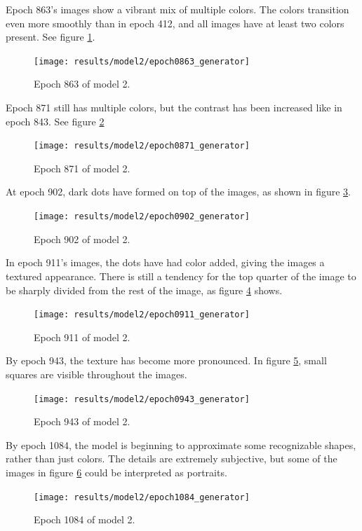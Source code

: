 \documentclass[11pt,letterpaper]{article}
\begin{document}
				Epoch 863's images show a vibrant mix of multiple colors.
				The colors transition even more smoothly than in epoch 412, and all images have at least two colors present.
				See figure \ref{fig:cgvg:epoch0863generator}.
				\begin{figure}
					\centering
					\texttt{[image: results/model2/epoch0863\_generator]}
					\caption{Epoch 863 of model 2.}
					\label{fig:cgvg:epoch0863generator}
				\end{figure}

				Epoch 871 still has multiple colors, but the contrast has been increased like in epoch 843.
				See figure \ref{fig:cgvg:epoch0871generator}
				\begin{figure}
					\centering
					\texttt{[image: results/model2/epoch0871\_generator]}
					\caption{Epoch 871 of model 2.}
					\label{fig:cgvg:epoch0871generator}
				\end{figure}

				At epoch 902, dark dots have formed on top of the images, as shown in figure \ref{fig:cgvg:epoch0902generator}.
				\begin{figure}
					\centering
					\texttt{[image: results/model2/epoch0902\_generator]}
					\caption{Epoch 902 of model 2.}
					\label{fig:cgvg:epoch0902generator}
				\end{figure}

				In epoch 911's images, the dots have had color added, giving the images a textured appearance.
				There is still a tendency for the top quarter of the image to be sharply divided from the rest of the image, as figure \ref{fig:cgvg:epoch0911generator} shows.
				\begin{figure}
					\centering
					\texttt{[image: results/model2/epoch0911\_generator]}
					\caption{Epoch 911 of model 2.}
					\label{fig:cgvg:epoch0911generator}
				\end{figure}

				By epoch 943, the texture has become more pronounced.
				In figure \ref{fig:cgvg:epoch0943generator}, small squares are visible throughout the images.
				\begin{figure}
					\centering
					\texttt{[image: results/model2/epoch0943\_generator]}
					\caption{Epoch 943 of model 2.}
					\label{fig:cgvg:epoch0943generator}
				\end{figure}

				By epoch 1084, the model is beginning to approximate some recognizable shapes, rather than just colors.
				The details are extremely subjective, but some of the images in figure \ref{fig:cgvg:epoch1084generator} could be interpreted as portraits.
				\begin{figure}
					\centering
					\texttt{[image: results/model2/epoch1084\_generator]}
					\caption{Epoch 1084 of model 2.}
					\label{fig:cgvg:epoch1084generator}
				\end{figure}
\end{document}
